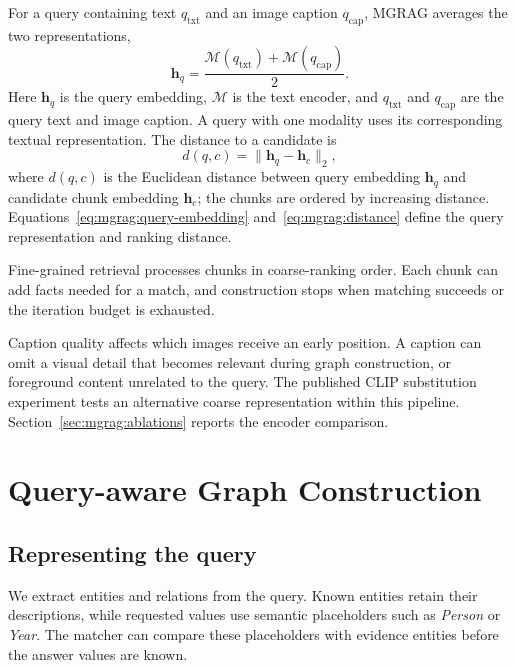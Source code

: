 For a query containing text $q_{\mathrm{txt}}$ and an image caption $q_{\mathrm{cap}}$, MGRAG averages the two representations,
\begin{equation}
\mathbf h_q=\frac{\mathcal M(q_{\mathrm{txt}})+\mathcal M(q_{\mathrm{cap}})}{2}.
\label{eq:mgrag:query-embedding}
\end{equation}
Here $\mathbf h_q$ is the query embedding, $\mathcal M$ is the text encoder, and $q_{\mathrm{txt}}$ and $q_{\mathrm{cap}}$ are the query text and image caption. A query with one modality uses its corresponding textual representation. The distance to a candidate is
\begin{equation}
 d(q,c)=\lVert\mathbf h_q-\mathbf h_c\rVert_2,
\label{eq:mgrag:distance}
\end{equation}
where $d(q,c)$ is the Euclidean distance between query embedding $\mathbf h_q$ and candidate chunk embedding $\mathbf h_c$; the chunks are ordered by increasing distance. Equations~\ref{eq:mgrag:query-embedding} and~\ref{eq:mgrag:distance} define the query representation and ranking distance.

Fine-grained retrieval processes chunks in coarse-ranking order. Each chunk can add facts needed for a match, and construction stops when matching succeeds or the iteration budget is exhausted.

Caption quality affects which images receive an early position. A caption can omit a visual detail that becomes relevant during graph construction, or foreground content unrelated to the query. The published CLIP substitution experiment tests an alternative coarse representation within this pipeline. Section~\ref{sec:mgrag:ablations} reports the encoder comparison.

\section{Query-aware Graph Construction}
\label{sec:mgrag:construction}

\subsection{Representing the query}

We extract entities and relations from the query. Known entities retain their descriptions, while requested values use semantic placeholders such as \emph{Person} or \emph{Year}. The matcher can compare these placeholders with evidence entities before the answer values are known.


